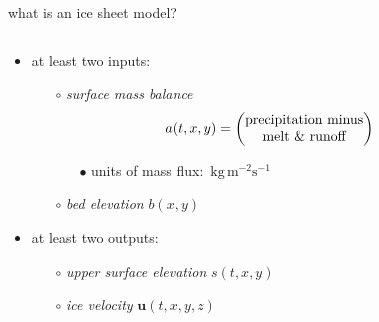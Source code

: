 \documentclass[svgnames,
               hyperref={colorlinks,citecolor=DeepPink4,linkcolor=FireBrick,urlcolor=Maroon},
               usepdftitle=false]  %
               {beamer}
\newcommand{\bu}{\mathbf{u}}
\begin{document}
\begin{frame}{what is an ice sheet model?}

\begin{columns}
\begin{column}{0.6\textwidth}
\begin{itemize}
\begin{definition}
an \alert{ice sheet model} is a \underline{map} which simulates an ice sheet in a climate
\end{definition} 
\item at least two inputs:
    \begin{itemize}
    \item[$\circ$] \emph{surface mass balance}
$$\hspace{-7mm} a(t,x,y) = \begin{pmatrix}
\text{precipitation minus} \\
\text{melt \& runoff}
\end{pmatrix}$$

\vspace{-3mm}
        \begin{itemize}
        \item[{\scriptsize $\bullet$}] units of mass flux:\, $\text{kg}\, \text{m}^{-2} \text{s}^{-1}$
        \end{itemize}

    \item[$\circ$] \emph{bed elevation} $b(x,y)$
    \end{itemize}
\item at least two outputs:
    \begin{itemize}
    \item[$\circ$] \emph{upper surface elevation} $s(t,x,y)$
    \item[$\circ$] \emph{ice velocity} $\bu(t,x,y,z)$
    \end{itemize}


\end{itemize}
\end{column}
\end{columns}
\end{frame}
\end{document}
